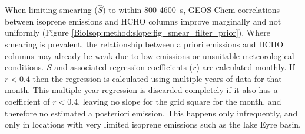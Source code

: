     
    
    When limiting smearing ($\hat{S}$) to within 800-4600~s, GEOS-Chem correlations between isoprene emissions and HCHO columns improve marginally and not uniformly (Figure \ref{BioIsop:method:slope:fig_smear_filter_prior}). 
    Where smearing is prevalent, the relationship between a priori emissions and HCHO columns may already be weak due to low emissions or unsuitable meteorological conditions.
    $S$ and associated regression coefficients ($r$) are calculated monthly.
    If $r<0.4$ then the regression is calculated using multiple years of data for that month.
    This multiple year regression is discarded completely if it also has a coefficient of $r<0.4$, leaving no slope for the grid square for the month, and therefore no estimated a posteriori emission.
    This happens only infrequently, and only in locations with very limited isoprene emissions such as the lake Eyre basin.
    
